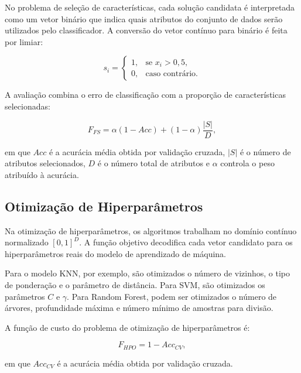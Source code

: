 No problema de seleção de características, cada solução candidata é interpretada como um vetor binário que indica quais atributos do conjunto de dados serão utilizados pelo classificador. A conversão do vetor contínuo para binário é feita por limiar:

\begin{equation}
    s_i =
    \begin{cases}
        1, & \text{se } x_i > 0{,}5,\\
        0, & \text{caso contrário.}
    \end{cases}
\end{equation}

A avaliação combina o erro de classificação com a proporção de características selecionadas:

\begin{equation}
    F_{FS} = \alpha(1 - Acc) + (1-\alpha)\frac{|S|}{D},
\end{equation}

em que $Acc$ é a acurácia média obtida por validação cruzada, $|S|$ é o número de atributos selecionados, $D$ é o número total de atributos e $\alpha$ controla o peso atribuído à acurácia.

\subsection{Otimização de Hiperparâmetros}

Na otimização de hiperparâmetros, os algoritmos trabalham no domínio contínuo normalizado $[0,1]^D$. A função objetivo decodifica cada vetor candidato para os hiperparâmetros reais do modelo de aprendizado de máquina.

Para o modelo KNN, por exemplo, são otimizados o número de vizinhos, o tipo de ponderação e o parâmetro de distância. Para SVM, são otimizados os parâmetros $C$ e $\gamma$. Para Random Forest, podem ser otimizados o número de árvores, profundidade máxima e número mínimo de amostras para divisão.

A função de custo do problema de otimização de hiperparâmetros é:

\begin{equation}
    F_{HPO} = 1 - Acc_{CV},
\end{equation}

em que $Acc_{CV}$ é a acurácia média obtida por validação cruzada.

